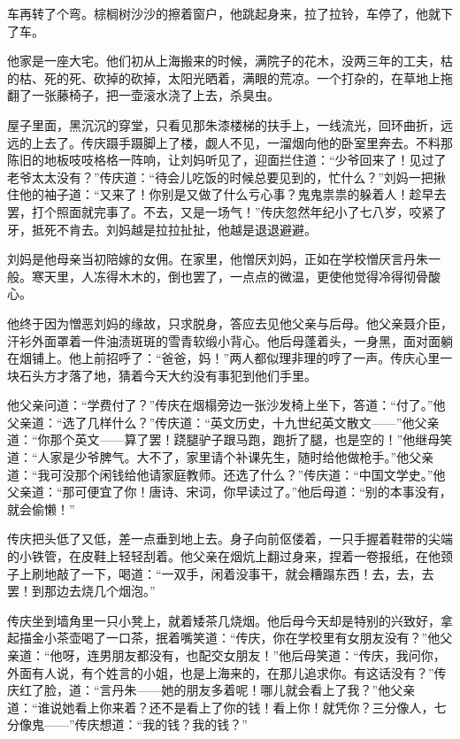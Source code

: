 \par 车再转了个弯。棕榈树沙沙的擦着窗户，他跳起身来，拉了拉铃，车停了，他就下了车。
\par 他家是一座大宅。他们初从上海搬来的时候，满院子的花木，没两三年的工夫，枯的枯、死的死、砍掉的砍掉，太阳光晒着，满眼的荒凉。一个打杂的，在草地上拖翻了一张藤椅子，把一壶滚水浇了上去，杀臭虫。
\par 屋子里面，黑沉沉的穿堂，只看见那朱漆楼梯的扶手上，一线流光，回环曲折，远远的上去了。传庆蹑手蹑脚上了楼，觑人不见，一溜烟向他的卧室里奔去。不料那陈旧的地板吱吱格格一阵响，让刘妈听见了，迎面拦住道：“少爷回来了！见过了老爷太太没有？”传庆道：“待会儿吃饭的时候总要见到的，忙什么？”刘妈一把揪住他的袖子道：“又来了！你别是又做了什么亏心事？鬼鬼祟祟的躲着人！趁早去罢，打个照面就完事了。不去，又是一场气！”传庆忽然年纪小了七八岁，咬紧了牙，抵死不肯去。刘妈越是拉拉扯扯，他越是退退避避。
\par 刘妈是他母亲当初陪嫁的女佣。在家里，他憎厌刘妈，正如在学校憎厌言丹朱一般。寒天里，人冻得木木的，倒也罢了，一点点的微温，更使他觉得冷得彻骨酸心。
\par 他终于因为憎恶刘妈的缘故，只求脱身，答应去见他父亲与后母。他父亲聂介臣，汗衫外面罩着一件油渍斑斑的雪青软缎小背心。他后母蓬着头，一身黑，面对面躺在烟铺上。他上前招呼了：“爸爸，妈！”两人都似理非理的哼了一声。传庆心里一块石头方才落了地，猜着今天大约没有事犯到他们手里。
\par 他父亲问道：“学费付了？”传庆在烟榻旁边一张沙发椅上坐下，答道：“付了。”他父亲道：“选了几样什么？”传庆道：“英文历史，十九世纪英文散文——”他父亲道：“你那个英文——算了罢！跷腿驴子跟马跑，跑折了腿，也是空的！”他继母笑道：“人家是少爷脾气。大不了，家里请个补课先生，随时给他做枪手。”他父亲道：“我可没那个闲钱给他请家庭教师。还选了什么？”传庆道：“中国文学史。”他父亲道：“那可便宜了你！唐诗、宋词，你早读过了。”他后母道：“别的本事没有，就会偷懒！”
\par 传庆把头低了又低，差一点垂到地上去。身子向前伛偻着，一只手握着鞋带的尖端的小铁管，在皮鞋上轻轻刮着。他父亲在烟炕上翻过身来，捏着一卷报纸，在他颈子上刷地敲了一下，喝道：“一双手，闲着没事干，就会糟蹋东西！去，去，去罢！到那边去烧几个烟泡。”
\par 传庆坐到墙角里一只小凳上，就着矮茶几烧烟。他后母今天却是特别的兴致好，拿起描金小茶壶喝了一口茶，抿着嘴笑道：“传庆，你在学校里有女朋友没有？”他父亲道：“他呀，连男朋友都没有，也配交女朋友！”他后母笑道：“传庆，我问你，外面有人说，有个姓言的小姐，也是上海来的，在那儿追求你。有这话没有？”传庆红了脸，道：“言丹朱——她的朋友多着呢！哪儿就会看上了我？”他父亲道：“谁说她看上你来着？还不是看上了你的钱！看上你！就凭你？三分像人，七分像鬼——”传庆想道：“我的钱？我的钱？”
